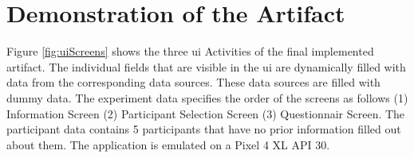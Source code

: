 \section{Demonstration of the Artifact}

Figure \ref{fig:uiScreens} shows the three \ac{ui} Activities of the final implemented artifact. The individual fields that are visible in the \ac{ui} are dynamically filled with data from the corresponding data sources. These data sources are filled with dummy data. The experiment data specifies the order of the screens as follows (1) Information Screen (2) Participant Selection Screen (3) Questionnair Screen. The participant data contains 5 participants that have no prior information filled out about them. The application is emulated on a Pixel 4 XL API 30.

\begin{figure}[htbp]
    \centering
    \begin{subfigure}[b]{0.25\textwidth}
        \centering

\end{subfigure}
\end{figure}
